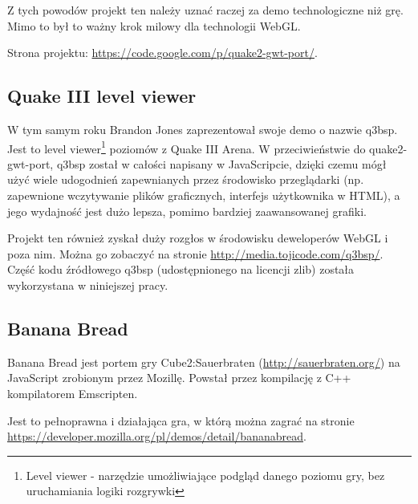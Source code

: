 Z tych powodów projekt ten należy uznać raczej za demo technologiczne niż
grę. Mimo to był to ważny krok milowy dla technologii WebGL.

Strona projektu: \url{https://code.google.com/p/quake2-gwt-port/}.

\subsection{Quake III level viewer}
\label{ssec:quake3web}

W tym samym roku Brandon Jones zaprezentował swoje demo o nazwie q3bsp.
Jest to level viewer\footnote{Level viewer - narzędzie umożliwiające
  podgląd danego poziomu gry, bez uruchamiania logiki rozgrywki} poziomów
z Quake III Arena. W przeciwieństwie do quake2-gwt-port, q3bsp został
w całości napisany w JavaScripcie, dzięki czemu mógł użyć wiele udogodnień
zapewnianych przez środowisko przeglądarki (np. zapewnione wczytywanie
plików graficznych, interfejs użytkownika w HTML), a jego wydajność
jest dużo lepsza, pomimo bardziej zaawansowanej grafiki.

Projekt ten również zyskał duży rozgłos w środowisku deweloperów WebGL
i poza nim. Można go zobaczyć na stronie \url{http://media.tojicode.com/q3bsp/}.
Część kodu źródłowego
q3bsp (udostępnionego na licencji zlib) została wykorzystana w niniejszej pracy.

\subsection{Banana Bread}
\label{ssec:bananaBread}

Banana Bread jest portem gry Cube2:Sauerbraten (\url{http://sauerbraten.org/})
na JavaScript zrobionym
przez Mozillę. Powstał przez kompilację z C++ kompilatorem Emscripten.

Jest to pełnoprawna i działająca gra, w którą można zagrać na stronie \url{https://developer.mozilla.org/pl/demos/detail/bananabread}.


